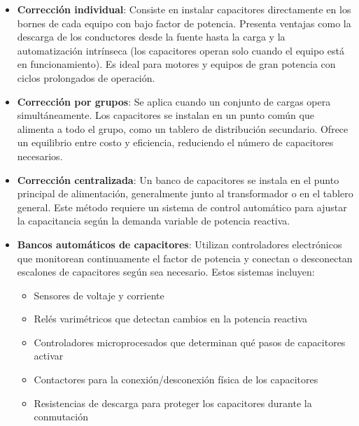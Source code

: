 \documentclass{report}          %
\begin{document}
                \begin{itemize}
                    \item \textbf{Corrección individual}: Consiste en instalar capacitores directamente en los bornes de cada equipo con bajo factor de potencia. Presenta ventajas como la descarga de los conductores desde la fuente hasta la carga y la automatización intrínseca (los capacitores operan solo cuando el equipo está en funcionamiento). Es ideal para motores y equipos de gran potencia con ciclos prolongados de operación.
                    
                    \item \textbf{Corrección por grupos}: Se aplica cuando un conjunto de cargas opera simultáneamente. Los capacitores se instalan en un punto común que alimenta a todo el grupo, como un tablero de distribución secundario. Ofrece un equilibrio entre costo y eficiencia, reduciendo el número de capacitores necesarios.
                    
                    \item \textbf{Corrección centralizada}: Un banco de capacitores se instala en el punto principal de alimentación, generalmente junto al transformador o en el tablero general. Este método requiere un sistema de control automático para ajustar la capacitancia según la demanda variable de potencia reactiva.
                    
                    \item \textbf{Bancos automáticos de capacitores}: Utilizan controladores electrónicos que monitorean continuamente el factor de potencia y conectan o desconectan escalones de capacitores según sea necesario. Estos sistemas incluyen:
                    \begin{itemize}
                        \item Sensores de voltaje y corriente
                        \item Relés varimétricos que detectan cambios en la potencia reactiva
                        \item Controladores microprocesados que determinan qué pasos de capacitores activar
                        \item Contactores para la conexión/desconexión física de los capacitores
                        \item Resistencias de descarga para proteger los capacitores durante la conmutación
                    \end{itemize}
                    

\end{itemize}
\end{document}
